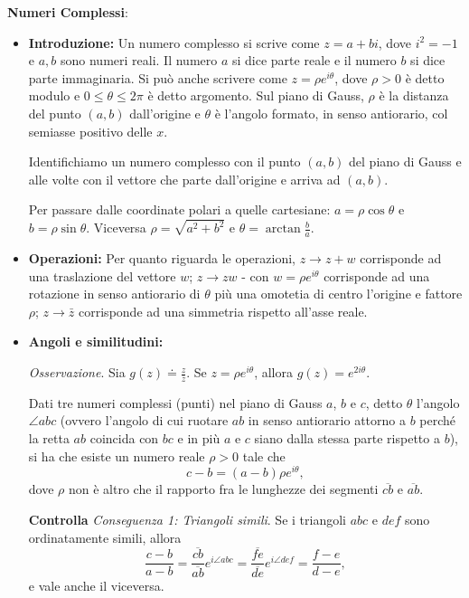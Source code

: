 \vspace{0.3cm}
\textbf{Numeri Complessi}:
\begin{itemize}
\item \textbf{Introduzione:} Un numero complesso si scrive come $z=a+bi$, dove $i^2=-1$ e $a,b$ sono numeri reali. Il numero $a$ si dice parte reale e il numero $b$ si dice parte immaginaria. Si può anche scrivere come $z=\rho e^{i\theta}$, dove $\rho>0$ è detto modulo e $0\leq \theta\leq 2\pi$ è detto argomento. Sul piano di Gauss, $\rho$ è la distanza del punto $(a,b)$ dall'origine e $\theta$ è l'angolo formato, in senso antiorario, col semiasse positivo delle $x$.

Identifichiamo un numero complesso con il punto $(a,b)$ del piano di Gauss e alle volte con il vettore che parte dall'origine e arriva ad $(a,b)$.

Per passare dalle coordinate polari a quelle cartesiane: $a=\rho \cos\theta$ e $b=\rho\sin\theta$. Viceversa $\rho=\sqrt{a^2+b^2}$ e $\theta=\arctan{\frac{b}{a}}$. 

\item \textbf{Operazioni:} Per quanto riguarda le operazioni, $z\to z+w$ corrisponde ad una traslazione del vettore $w$; $z\to zw$ - con $w=\rho e^{i\theta}$ corrisponde ad una rotazione in senso antiorario di $\theta$ più una omotetia di centro l'origine e fattore $\rho$; $z\to \bar{z}$ corrisponde ad una simmetria rispetto all'asse reale. 

\item \textbf{Angoli e similitudini:}

\emph{Osservazione}. Sia $g(z)\doteq \frac{z}{\bar z}$. Se $z=\rho e^{i\theta}$, allora $g(z)=e^{2i\theta}$. 

Dati tre numeri complessi (punti) nel piano di Gauss $a$, $b$ e $c$, detto $\theta$ l'angolo $\angle abc$ (ovvero l'angolo di cui ruotare $ab$ in senso antiorario attorno a $b$ perché la retta $ab$ coincida con $bc$ e in più $a$ e $c$ siano dalla stessa parte rispetto a $b$), si ha che esiste un numero reale $\rho>0$ tale che 
$$
c-b=(a-b)\rho e^{i\theta},
$$
dove $\rho$ non è altro che il rapporto fra le lunghezze dei segmenti $\overline{cb}$ e $\overline{ab}$. 

\textbf{Controlla} \emph{Conseguenza 1: Triangoli simili}. Se i triangoli $abc$ e $def$ sono ordinatamente simili, allora 
$$
\frac{c-b}{a-b}=\frac{\overline{cb}}{\overline{ab}}e^{i\angle abc}=\frac{\overline{fe}}{\overline{de}}e^{i\angle def}=\frac{f-e}{d-e},
$$
e vale anche il viceversa.


\end{itemize}
